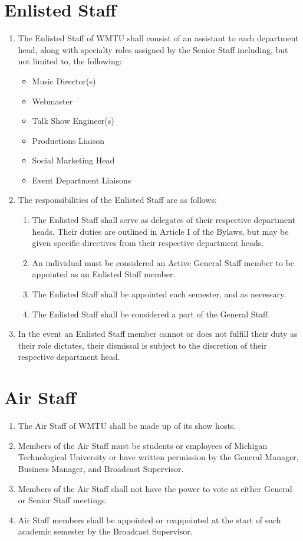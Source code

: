\documentclass[12pt]{constitution}
\begin{document}
\section{Enlisted Staff}
\begin{enumerate}
\item The Enlisted Staff of WMTU shall consist of an assistant to each department head, along with specialty roles assigned by the Senior Staff including, but not limited to, the following:
\begin{itemize}
\item Music Director(s)
\item Webmaster
\item Talk Show Engineer(s)
\item Productions Liaison
\item Social Marketing Head
\item Event Department Liaisons
\end{itemize}
\item The responsibilities of the Enlisted Staff are as follows:
\begin{enumerate}
\item The Enlisted Staff shall serve as delegates of their respective department heads. Their duties are outlined in Article I of the Bylaws, but may be given specific directives from their respective department heads.
\item An individual must be considered an Active General Staff member to be appointed as an Enlisted Staff member.
\item The Enlisted Staff shall be appointed each semester, and as necessary.
\item The Enlisted Staff shall be considered a part of the General Staff.
\end{enumerate}
\item In the event an Enlisted Staff member cannot or does not fulfill their duty as their role dictates, their dismissal is subject to the discretion of their respective department head.
\end{enumerate}


\section{​Air Staff}
\begin{enumerate}
\item The Air Staff of WMTU shall be made up of its show hosts.
\item Members of the Air Staff must be students or employees of Michigan Technological University or have written permission by the General Manager, Business Manager, and Broadcast Supervisor.
\item Members of the Air Staff shall not have the power to vote at either General or Senior Staff meetings.
\item Air Staff members shall be appointed or reappointed at the start of each academic semester by the Broadcast Supervisor.
\end{enumerate}
\end{document}

